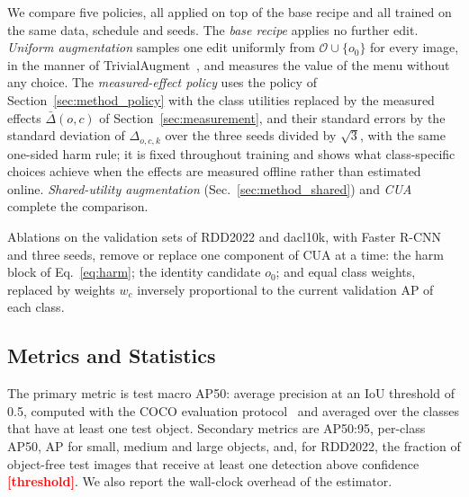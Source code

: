 \documentclass[conference]{IEEEtran}
\newcommand{\todo}[1]{\textcolor{red}{\textbf{[#1]}}}
\begin{document}
We compare five policies, all applied on top of the base recipe and all trained on the same data, schedule and seeds. The \emph{base recipe} applies no further edit. \emph{Uniform augmentation} samples one edit uniformly from $\mathcal{O}\cup\{o_0\}$ for every image, in the manner of TrivialAugment~\cite{muller2021trivial}, and measures the value of the menu without any choice. The \emph{measured-effect policy} uses the policy of Section~\ref{sec:method_policy} with the class utilities replaced by the measured effects $\bar\Delta(o,c)$ of Section~\ref{sec:measurement}, and their standard errors by the standard deviation of $\Delta_{o,c,k}$ over the three seeds divided by $\sqrt{3}$, with the same one-sided harm rule; it is fixed throughout training and shows what class-specific choices achieve when the effects are measured offline rather than estimated online. \emph{Shared-utility augmentation} (Sec.~\ref{sec:method_shared}) and \emph{CUA} complete the comparison.

Ablations on the validation sets of RDD2022 and dacl10k, with Faster R-CNN and three seeds, remove or replace one component of CUA at a time: the harm block of Eq.~\eqref{eq:harm}; the identity candidate $o_0$; and equal class weights, replaced by weights $w_c$ inversely proportional to the current validation AP of each class.

\subsection{Metrics and Statistics}
\label{sec:setup_metrics}

The primary metric is test macro AP50: average precision at an IoU threshold of 0.5, computed with the COCO evaluation protocol~\cite{lin2014coco} and averaged over the classes that have at least one test object. Secondary metrics are AP50:95, per-class AP50, AP for small, medium and large objects, and, for RDD2022, the fraction of object-free test images that receive at least one detection above confidence \todo{threshold}. We also report the wall-clock overhead of the estimator.
\end{document}
